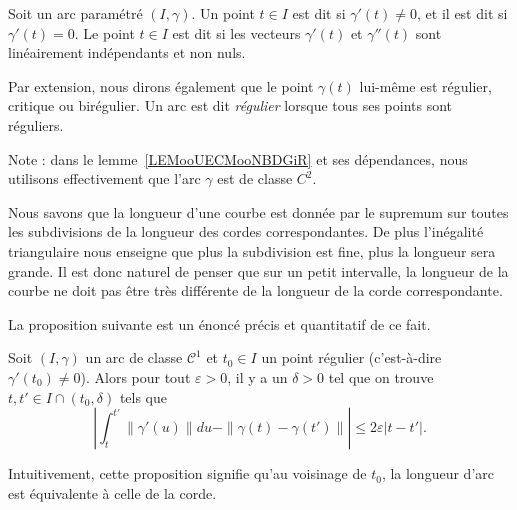 \begin{definition}
	Soit un arc paramétré \( (I,\gamma)\). Un point \( t\in I\) est dit  si \( \gamma'(t)\neq 0\), et il est dit  si \( \gamma'(t)=0\). Le point \( t\in I\) est dit  si les vecteurs \( \gamma'(t)\) et \( \gamma''(t)\) sont linéairement indépendants et non nuls.

	Par extension, nous dirons également que le point \( \gamma(t)\) lui-même est régulier, critique ou birégulier. Un arc est dit \emph{régulier} lorsque tous ses points sont réguliers.
\end{definition}
Note : dans le lemme~\ref{LEMooUECMooNBDGiR} et ses dépendances, nous utilisons effectivement que l'arc \( \gamma\) est de classe \( C^2\).

Nous savons que la longueur d'une courbe est donnée par le supremum sur toutes les subdivisions de la longueur des cordes correspondantes. De plus l'inégalité triangulaire nous enseigne que plus la subdivision est fine, plus la longueur sera grande. Il est donc naturel de penser que sur un petit intervalle, la longueur de la courbe ne doit pas être très différente de la longueur de la corde correspondante.

La proposition suivante est un énoncé précis et quantitatif de ce fait.
\begin{proposition}
	Soit \( (I,\gamma)\) un arc de classe \( \mathcal{C}^1\) et \( t_0\in I\) un point régulier (c'est-à-dire \( \gamma'(t_0)\neq 0\)). Alors pour tout \( \varepsilon>0\), il y a un \( \delta>0\) tel que on trouve  \( t,t'\in I\cap(t_0,\delta)\) tels que
	\begin{equation}
		\left| \int_t^{t'}\| \gamma'(u) \|du-\| \gamma(t)-\gamma(t') \| \right| \leq 2\varepsilon| t-t' |.
	\end{equation}
\end{proposition}
Intuitivement, cette proposition signifie qu'au voisinage de \( t_0\), la longueur d'arc est équivalente à celle de la corde.

